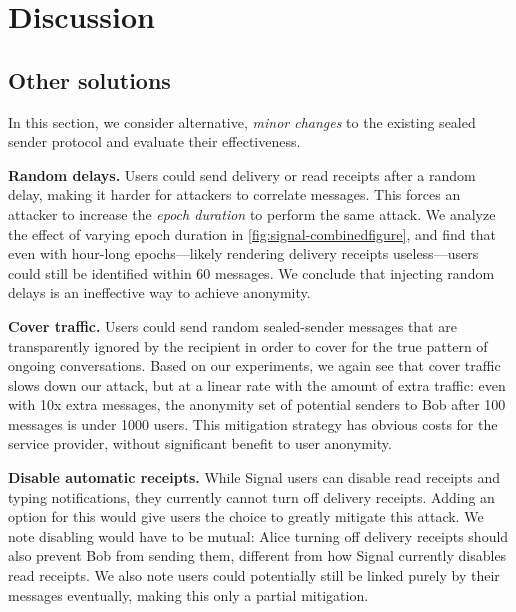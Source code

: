 \section{Discussion}
\label{sec:signal-discussion}

\subsection{Other solutions}\label{sec:signal-othersolutions} %
In this section, we consider alternative, \emph{minor
changes} to the existing sealed sender protocol and evaluate their effectiveness.


\medskip \noindent
\textbf{Random delays.}
Users could send delivery or read receipts after a
random delay, making it harder for attackers to correlate messages.
This forces an attacker to increase the \emph{epoch duration} to
perform the same attack. We analyze the effect of varying epoch duration in
\cref{fig:signal-combinedfigure}, and find that even
with hour-long epochs---likely rendering delivery receipts useless---users could
still be identified within 60 messages.
We conclude that injecting random delays is an ineffective way to achieve anonymity.


\medskip \noindent
\textbf{Cover traffic.}
Users could send random sealed-sender messages that are transparently
ignored by the recipient in order to cover for the true pattern of ongoing
conversations. Based on our experiments, we again see that cover traffic slows
down our attack, but at a linear rate with the amount of extra traffic: even
with 10x extra messages, the anonymity set of potential senders to Bob after 100
messages is under 1000 users. This
mitigation strategy has obvious costs for the service provider, without
significant benefit to user anonymity.

\medskip \noindent
\textbf{Disable automatic receipts.}
While Signal users can disable read receipts and typing notifications,
they currently cannot turn off delivery receipts. Adding an option for this would
give users the choice to greatly mitigate this attack. We note disabling would
have to be mutual: Alice turning off delivery receipts should also prevent Bob
from sending them, different from how Signal currently disables read receipts.
We also note users could potentially still be linked purely by their messages
eventually, making this only a partial mitigation.




